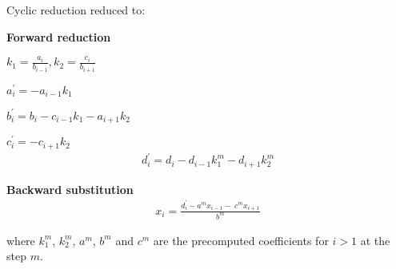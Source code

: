 \begin{frame}
Cyclic reduction reduced to:

\vspace{1cm}

\textbf{Forward reduction}

\hspace{3.85cm} \sout{$k_1 = \frac{a_i}{b_{i-1}}, k_2 = \frac{c_i}{b_{i+1}}$}

\hspace{3.85cm} \sout{$a^{\prime}_i = -a_{i-1}k_1$}

\hspace{3.85cm} \sout{$b^{\prime}_i = b_i - c_{i-1}k_1 - a_{i+1}k_2$}

\hspace{3.85cm} \sout{$c^{\prime}_i = -c_{i+1}k_2$} 
\begin{align*}
d^{\prime}_i = d_i - d_{i-1}k_1^{m}  - d_{i+1}k_2^{m}
\end{align*}

\textbf{Backward substitution}
\begin{align*}
x_i = \frac{d^{\prime}_i - a^mx_{i-1} - \
    c^{m}x_{i+1}}{b^m}
\end{align*}

where $k_1^m$, $k_2^m$, $a^m$, $b^m$ and $c^m$ are the precomputed
coefficients for $i>1$ at the step $m$.
\end{frame}
